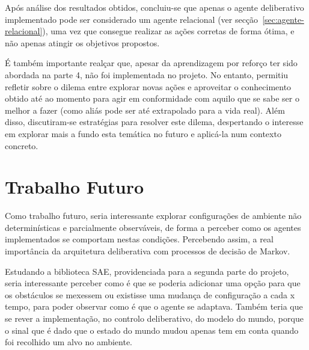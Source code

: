 Após análise dos resultados obtidos, concluiu-se que apenas o agente deliberativo implementado pode ser considerado um agente relacional (ver secção~\ref{sec:agente-relacional}), uma vez que consegue realizar as ações corretas de forma ótima, e não apenas atingir os objetivos propostos.

 É também importante realçar que, apesar da aprendizagem por reforço ter sido abordada na parte 4, não foi implementada no projeto.
No entanto, permitiu refletir sobre o dilema entre explorar novas ações e aproveitar o conhecimento obtido até ao momento para agir em conformidade com aquilo que se sabe ser o melhor a fazer (como aliás pode ser até extrapolado para a vida real).
Além disso, discutiram-se estratégias para resolver este dilema, despertando o interesse em explorar mais a fundo esta temática no futuro e aplicá-la num contexto concreto.


\section{Trabalho Futuro}\label{sec:trabalho-futuro}

Como trabalho futuro, seria interessante explorar configurações de ambiente não determinísticas e parcialmente observáveis, de forma a perceber como os agentes implementados se comportam nestas condições.
Percebendo assim, a real importância da arquitetura deliberativa com processos de decisão de Markov.

Estudando a biblioteca SAE, providenciada para a segunda parte do projeto, seria interessante perceber como é que se poderia adicionar uma opção para que os obstáculos se mexessem ou existisse uma mudança de configuração a cada x tempo, para poder observar como é que o agente se adaptava.
Também teria que se rever a implementação, no controlo deliberativo, do modelo do mundo, porque o sinal que é dado que o estado do mundo mudou apenas tem em conta quando foi recolhido um alvo no ambiente.
